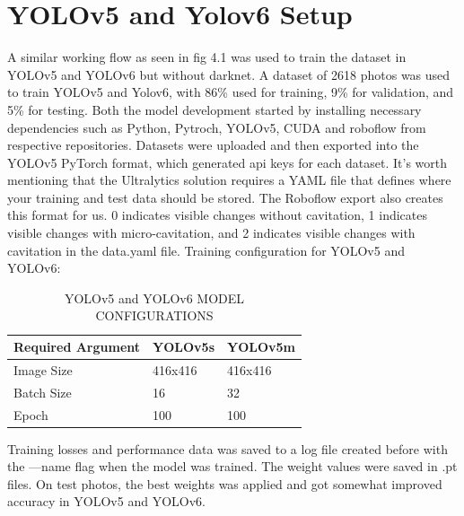 \section{YOLOv5 and Yolov6 Setup} A similar working flow as seen in fig 4.1 was used to train the dataset in YOLOv5 and YOLOv6 but without darknet. A dataset of 2618 photos was used to train YOLOv5 and Yolov6, with 86\% used for training, 9\% for validation, and 5\% for testing.
Both the model development started by installing necessary dependencies such as Python, Pytroch, YOLOv5, CUDA and roboflow from respective repositories. Datasets were uploaded and then exported into the YOLOv5 PyTorch format, which generated api keys for each dataset. It's worth mentioning that the Ultralytics solution requires a YAML file that defines where your training and test data should be stored. The Roboflow export also creates this format for us. 0 indicates visible changes without cavitation, 1 indicates visible changes with micro-cavitation, and 2 indicates visible changes with cavitation in the data.yaml file. Training configuration for YOLOv5 and YOLOv6:
\begin{table}[H]
\caption{YOLOv5 and YOLOv6 MODEL CONFIGURATIONS}
\centering
\begin{tabular}{|l|l|l|} 
\hline
\textcolor[rgb]{0.141,0.125,0.129}{Required Argument} & \textcolor[rgb]{0.141,0.125,0.129}{YOLOv5s} & \textcolor[rgb]{0.141,0.125,0.129}{YOLOv5m}  \\ 
\hline
\textcolor[rgb]{0.141,0.125,0.129}{Image Size}        & \textcolor[rgb]{0.141,0.125,0.129}{416x416} & \textcolor[rgb]{0.141,0.125,0.129}{416x416}  \\ 
\hline
\textcolor[rgb]{0.141,0.125,0.129}{Batch Size}        & \textcolor[rgb]{0.141,0.125,0.129}{16}      & \textcolor[rgb]{0.141,0.125,0.129}{32}       \\ 
\hline
\textcolor[rgb]{0.141,0.125,0.129}{Epoch}             & \textcolor[rgb]{0.141,0.125,0.129}{100}     & \textcolor[rgb]{0.141,0.125,0.129}{100}      \\
\hline
\end{tabular}
\end{table}
Training losses and performance data was saved to a log file created before with the —name flag when the model was trained. The weight values were saved in .pt files. On test photos, the best weights was applied and got somewhat improved accuracy in YOLOv5 and YOLOv6.
